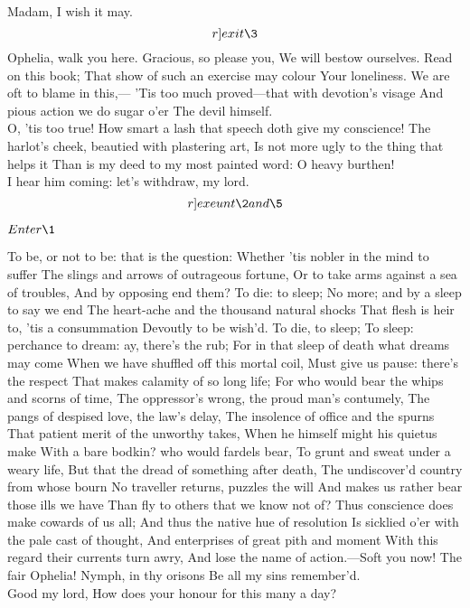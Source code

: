 \documentclass[11pt]{book}
\begin{document}
\4	Madam, I wish it may. 	\[r]exit \3\]
\5	Ophelia, walk you here. Gracious, so please you,
	We will bestow ourselves. Read on this book;
	That show of such an exercise may colour
	Your loneliness. We are oft to blame in this,---
	'Tis too much proved---that with devotion's visage
	And pious action we do sugar o'er
	The devil himself. \\

\aparte\2           O, 'tis too true!
	How smart a lash that speech doth give my conscience!
	The harlot's cheek, beautied with plastering art,
	Is not more ugly to the thing that helps it
	Than is my deed to my most painted word:
	O heavy burthen! \\

\5	I hear him coming: let's withdraw, my lord. 	\[r]exeunt \2 and \5\]

	\(Enter \1\)

\1	To be, or not to be: that is the question:
	Whether 'tis nobler in the mind to suffer
	The slings and arrows of outrageous fortune,
	Or to take arms against a sea of troubles,
	And by opposing end them? To die: to sleep;
	No more; and by a sleep to say we end
	The heart-ache and the thousand natural shocks
	That flesh is heir to, 'tis a consummation
	Devoutly to be wish'd. To die, to sleep;
	To sleep: perchance to dream: ay, there's the rub;
	For in that sleep of death what dreams may come
	When we have shuffled off this mortal coil,
	Must give us pause: there's the respect
	That makes calamity of so long life;
	For who would bear the whips and scorns of time,
	The oppressor's wrong, the proud man's contumely,
	The pangs of despised love, the law's delay,
	The insolence of office and the spurns
	That patient merit of the unworthy takes,
	When he himself might his quietus make
	With a bare bodkin? who would fardels bear,
	To grunt and sweat under a weary life,
	But that the dread of something after death,
	The undiscover'd country from whose bourn
	No traveller returns, puzzles the will
	And makes us rather bear those ills we have
	Than fly to others that we know not of?
	Thus conscience does make cowards of us all;
	And thus the native hue of resolution
	Is sicklied o'er with the pale cast of thought,
	And enterprises of great pith and moment
	With this regard their currents turn awry,
	And lose the name of action.---Soft you now!
	The fair Ophelia! Nymph, in thy orisons
	Be all my sins remember'd. \\

\4	Good my lord,
	How does your honour for this many a day?
\end{document}
